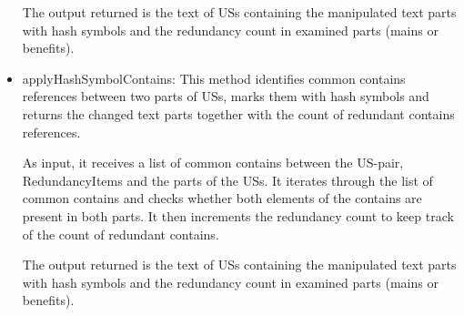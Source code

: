 \begin{itemize}
	The output returned is the text of USs containing the manipulated text parts with hash symbols and the redundancy count in examined parts (mains or benefits).
	
	\item applyHashSymbolContains: This method identifies common contains references between two parts of USs, marks them with hash symbols and returns the changed text parts together with the count of redundant contains references. 
	
	As input, it receives a list of common contains between the US-pair, RedundancyItems and the parts of the USs. It iterates through the list of common contains and checks whether both elements of the contains are present in both parts. It then increments the redundancy count to keep track of the count of redundant contains.
	
	The output returned is the text of USs containing the manipulated text parts with hash symbols and the redundancy count in examined parts (mains or benefits).
	
\end{itemize}
